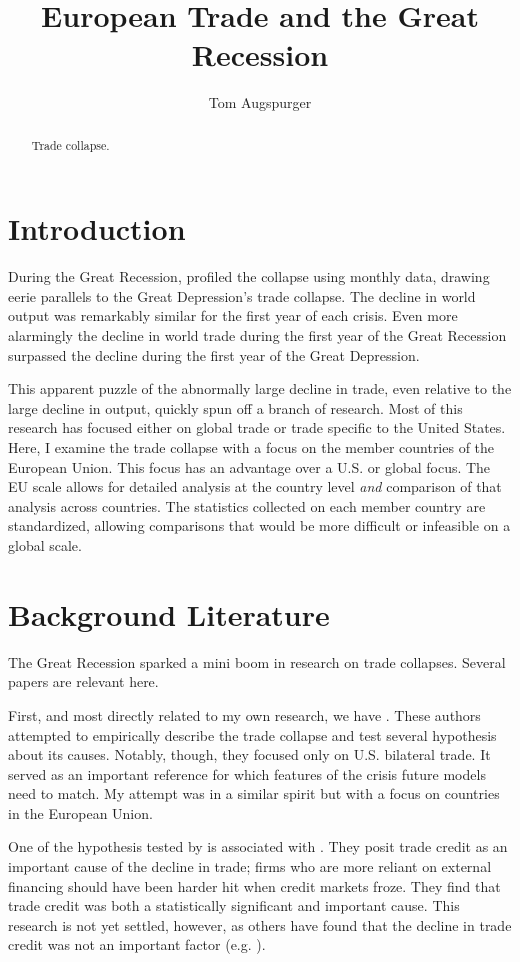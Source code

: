 \documentclass[11pt]{article}
\title{European Trade and the Great Recession}
\author{Tom Augspurger}
\date{}
\begin{document}
\maketitle
\begin{abstract}
  Trade collapse.
\end{abstract}
\section{Introduction}
\label{sec:introduction}

  During the Great Recession, \cite{eichengreen_orourke:2010} profiled the collapse using monthly data, drawing eerie parallels to the Great Depression's trade collapse.  The decline in world output was remarkably similar for the first year of each crisis.  Even more alarmingly the decline in world trade during the first year of the Great Recession surpassed the decline during the first year of the Great Depression.

  This apparent puzzle of the abnormally large decline in trade, even relative to the large decline in output, quickly spun off a branch of research.  Most of this research has focused either on global trade or trade specific to the United States.  Here, I examine the trade collapse with a focus on the member countries of the European Union.  This focus has an advantage over a U.S. or global focus.  The EU scale allows for detailed analysis at the country level \emph{and} comparison of that analysis across countries. The statistics collected on each member country are standardized, allowing comparisons that would be more difficult or infeasible on a global scale.

\section{Background Literature}
\label{sec:background_literature}
  The Great Recession sparked a mini boom in research on trade collapses.  Several papers are relevant here. 

  First, and most directly related to my own research, we have \cite{llt:2010}.  These authors attempted to empirically describe the trade collapse and test several hypothesis about its causes.  Notably, though, they focused only on U.S. bilateral trade.  It served as an important reference for which features of the crisis future models need to match.  My attempt was in a similar spirit but with a focus on countries in the European Union.

  One of the hypothesis tested by \cite{llt:2010} is associated with \cite{chor-manova:2012}. They posit trade credit as an important cause of the decline in trade; firms who are more reliant on external financing should have been harder hit when credit markets froze.  They find that trade credit was both a statistically significant and important cause.  This research is not yet settled, however, as others have found that the decline in trade credit was not an important factor (e.g. \cite{RePEc:imf:imfwpa:11/16}).
\end{document}
